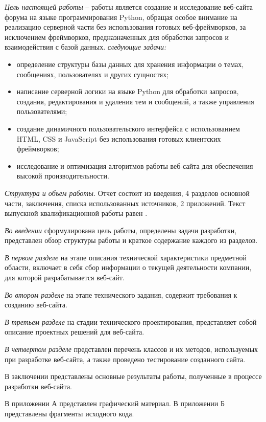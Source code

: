 \emph{Цель настоящей работы} – работы является создание и исследование веб-сайта форума на языке программирования Python, обращая особое внимание на реализацию серверной части без использования готовых веб-фреймворков, за исключением фреймворков, предназначенных для обработки запросов и взаимодействия с базой данных. \emph{следующие задачи:}
\begin{itemize}
\item определение структуры базы данных для хранения информации о темах, сообщениях, пользователях и других сущностях;
\item написание серверной логики на языке Python для обработки запросов, создания, редактирования и удаления тем и сообщений, а также управления пользователями;
\item создание динамичного пользовательского интерфейса с использованием HTML, CSS и JavaScript без использования готовых клиентских фреймворков;
\item исследование и оптимизация алгоритмов работы веб-сайта для обеспечения высокой производительности.
\end{itemize}

\emph{Структура и объем работы.} Отчет состоит из введения, 4 разделов основной части, заключения, списка использованных источников, 2 приложений. Текст выпускной квалификационной работы равен .

\emph{Во введении} сформулирована цель работы, определены задачи разработки, представлен обзор структуры работы и краткое содержание каждого из разделов.

\emph{В первом разделе} на этапе описания технической характеристики предметной области, включает в себя сбор информации о текущей деятельности компании, для которой разрабатывается веб-сайт.

\emph{Во втором разделе} на этапе технического задания, содержит требования к созданию веб-сайта.

\emph{В третьем разделе} на стадии технического проектирования, представляет собой описание проектных решений для веб-сайта.

\emph{В четвертом разделе} представлен перечень классов и их методов, используемых при разработке веб-сайта, а также проведено тестирование созданного сайта.

В заключении представлены основные результаты работы, полученные в процессе разработки веб-сайта.


В приложении А представлен графический материал.
В приложении Б представлены фрагменты исходного кода. 
